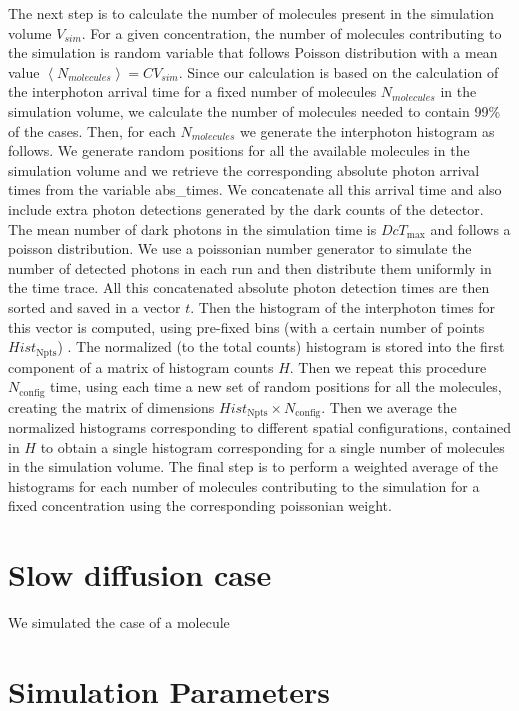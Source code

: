 The next step is to calculate the number of molecules present in the simulation volume  $V_{sim}$. For a given concentration, the number of molecules contributing to the simulation is random variable that follows Poisson distribution with a mean value $\left<N_{molecules}\right> = C V_{sim}$. Since our calculation is based on the calculation of the interphoton arrival time for a fixed number of molecules $N_{molecules}$ in the simulation volume, we calculate the number of molecules needed to contain 99\% of the cases. Then, for each $N_{molecules}$ we generate the interphoton histogram as follows. We generate random positions for all the available molecules in the simulation volume and we retrieve the corresponding absolute photon arrival times from the variable abs\_times. We concatenate all this arrival time and also include extra photon detections generated by the dark counts of the detector. The mean number of dark photons in the simulation time is $Dc T_{\mbox{max}}$ and follows a poisson distribution. We use a poissonian number generator to simulate the number of detected photons in each run and then distribute them uniformly in the time trace. All this concatenated absolute photon detection times are then sorted and saved in a vector $t$. Then the histogram of the interphoton times for this vector is computed, using pre-fixed bins (with a certain number of points $Hist_{\mbox{Npts}}$) . The normalized (to the total counts) histogram is stored into the first component of a matrix of histogram counts $H$. Then we repeat this procedure $N_{\mbox{config}}$ time, using each time a new set of random positions for all the molecules, creating the matrix of dimensions $Hist_{\mbox{Npts}} \times N_{\mbox{config}}$. Then we average the normalized histograms corresponding to different spatial configurations, contained in $H$ to obtain a single histogram corresponding for a single number of molecules in the simulation volume. The final step is to perform a weighted average of the histograms for each number of molecules contributing to the simulation for a fixed concentration using the corresponding poissonian weight.



\section*{Slow diffusion case}

We simulated the case of a molecule 


\section*{Simulation Parameters\label{ap:sim_param}}

